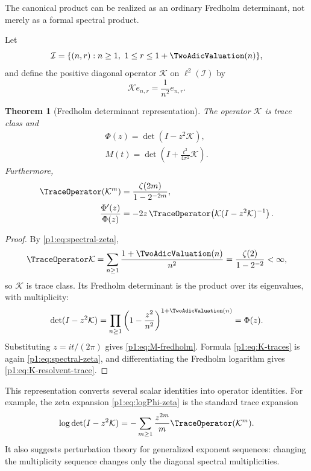 \documentclass[11pt]{article}
\newtheorem{theorem}{Theorem}[section]
\theoremstyle{definition}
\theoremstyle{remark}
\newcommand{\cK}{\mathcal K}
\begin{document}
The canonical product can be realized as an ordinary Fredholm determinant, not merely as a
formal spectral product.

\begin{definition}
Let
\begin{equation}
 \mathcal I=\{(n,r):n\ge1,\ 1\le r\le 1+\TwoAdicValuation(n)\},
\end{equation}
and define the positive diagonal operator \(\cK\) on \(\ell^2(\mathcal I)\) by
\begin{equation}
 \cK e_{n,r}=\frac1{n^2}e_{n,r}.                             \label{p1:eq:K-def}
\end{equation}
\end{definition}

\begin{theorem}[Fredholm determinant representation]\label{p1:thm:fredholm}
The operator \(\cK\) is trace class and
\begin{align}
 \boxed{\Phi(z)=\det(I-z^2\cK)},                             \label{p1:eq:Phi-fredholm}\\
 \boxed{M(t)=\det\!\left(I+\frac{t^2}{4\pi^2}\cK\right)}.  \label{p1:eq:M-fredholm}
\end{align}
Furthermore,
\begin{align}
 \TraceOperator(\cK^m)&=\frac{\zeta(2m)}{1-2^{-2m}},        \label{p1:eq:K-traces}\\
 \frac{\Phi'(z)}{\Phi(z)}
 &=-2z\,\TraceOperator\!\left(\cK(I-z^2\cK)^{-1}\right). \label{p1:eq:K-resolvent-trace}
\end{align}
\end{theorem}

\begin{proof}
By \eqref{p1:eq:spectral-zeta},
\[
 \TraceOperator\cK=\sum_{n\ge1}\frac{1+\TwoAdicValuation(n)}{n^2}
 =\frac{\zeta(2)}{1-2^{-2}}<\infty,
\]
so \(\cK\) is trace class.  Its Fredholm determinant is the product over its eigenvalues,
with multiplicity:
\[
 \det(I-z^2\cK)
 =\prod_{n\ge1}\left(1-\frac{z^2}{n^2}\right)^{1+\TwoAdicValuation(n)}
 =\Phi(z).
\]
Substituting \(z=it/(2\pi)\) gives \eqref{p1:eq:M-fredholm}.  Formula
\eqref{p1:eq:K-traces} is again \eqref{p1:eq:spectral-zeta}, and differentiating the Fredholm
logarithm gives \eqref{p1:eq:K-resolvent-trace}.
\end{proof}

\begin{remark}
This representation converts several scalar identities into operator identities.  For
example, the zeta expansion \eqref{p1:eq:logPhi-zeta} is the standard trace expansion
\[
 \log\det(I-z^2\cK)=-\sum_{m\ge1}\frac{z^{2m}}m\TraceOperator(\cK^m).
\]
It also suggests perturbation theory for generalized exponent sequences: changing the
multiplicity sequence changes only the diagonal spectral multiplicities.
\end{remark}
\end{document}
